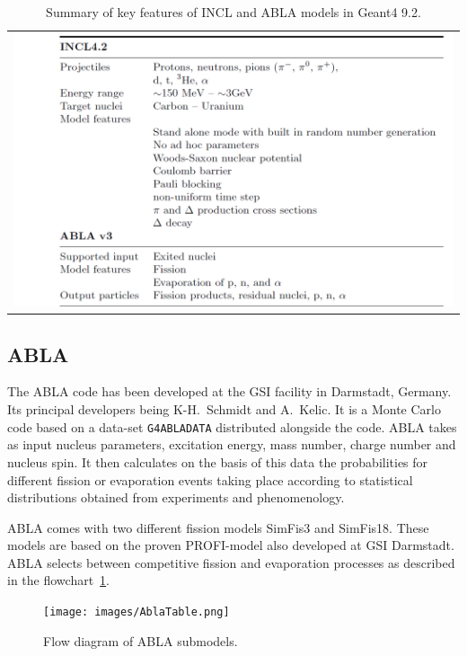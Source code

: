 \begin{center}
\begin{table}[!h]
\begin{tabular}{l}
\includegraphics[width=1\textwidth]{images/inclSummary.png}
\end{tabular}
\caption{\label{fig:inclpotential} Summary of key features of INCL and ABLA models in Geant4 9.2.}
\end{table}
\end{center}

\subsection{ABLA}

The ABLA code has been developed at the GSI facility in Darmstadt, Germany. Its principal developers being K-H.~Schmidt and A.~Kelic. It is a Monte Carlo code based on a data-set {\tt G4ABLADATA} distributed alongside the code. ABLA takes as input nucleus parameters, excitation energy, mass number, charge number and nucleus spin. It then calculates on the basis of this data the probabilities for different fission or evaporation events taking place according to statistical distributions obtained from experiments and phenomenology.

ABLA comes with two different fission models SimFis3 and SimFis18. These models are based on the proven PROFI-model also developed at GSI Darmstadt. ABLA selects between competitive fission and evaporation processes as described in the flowchart~\ref{fig:ablatable}.

\begin{figure}[h] 
\begin{center}
\texttt{[image: images/AblaTable.png]}
\caption{\label{fig:ablatable}Flow diagram of ABLA submodels.}
 \end{center}
 \end{figure}

